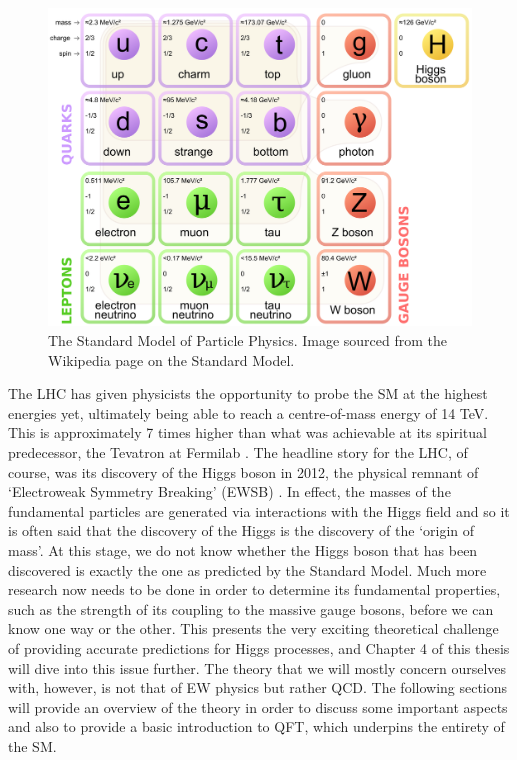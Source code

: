 \begin{figure}[t]
\centering
\includegraphics[scale=0.2]{Images/SM.png} 
\caption{The Standard Model of Particle Physics. Image sourced from the Wikipedia page on the Standard Model.}
\label{fig:SM}
\end{figure}

The LHC has given physicists the opportunity to probe the SM at the highest energies yet, ultimately being able to reach a centre-of-mass energy of 14 TeV. This is approximately 7 times higher than what was achievable at its spiritual predecessor, the Tevatron at Fermilab \cite{Holmes2011}. The headline story for the LHC, of course, was its discovery of the Higgs boson in 2012, the physical remnant of `Electroweak Symmetry Breaking' (EWSB) \cite{Aad2012,Higgs1964}. In effect, the masses of the fundamental particles are generated via interactions with the Higgs field and so it is often said that the discovery of the Higgs is the discovery of the `origin of mass'. At this stage, we do not know whether the Higgs boson that has been discovered is exactly the one as predicted by the Standard Model. Much more research now needs to be done in order to determine its fundamental properties, such as the strength of its coupling to the massive gauge bosons, before we can know one way or the other. This presents the very exciting theoretical challenge of providing accurate predictions for Higgs processes, and Chapter 4 of this thesis will dive into this issue further. The theory that we will mostly concern ourselves with, however, is not that of EW physics but rather QCD. The following sections will provide an overview of the theory in order to discuss some important aspects and also to provide a basic introduction to QFT, which underpins the entirety of the SM. 

